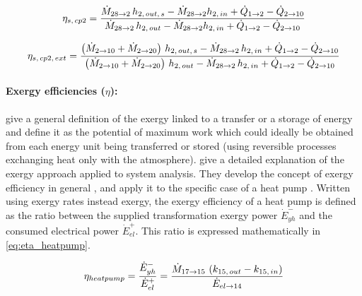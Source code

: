\begin{equation}
  \label{eq:eps_cp2_s}
  \eta_{s,\,cp2} = \dfrac{\dotM{28}{2} \, h_{2,\,out,\,s} - \dotM{28}{2}
    h_{2,\,in} + \dot{Q}_{1 \rightarrow 2} - \dot{Q}_{2 \rightarrow
      10}}{\dotM{28}{2} \, h_{2,\,out} - \dotM{28}{2} h_{2,\,in} +
    \dot{Q}_{1 \rightarrow 2} - \dot{Q}_{2 \rightarrow 10}}
  \tagaddtextone{$\left[-\right]$}
\end{equation}

\begin{equation}
  \label{eq:eps_cp2_s_ext}
  \eta_{s,\,cp2,\,ext} = \dfrac{\left( \dotM{2}{10} + \dotM{2}{20}
    \right) \, h_{2,\,out,\,s} - \dotM{28}{2} \, h_{2,\,in} +
    \dot{Q}_{1 \rightarrow 2} - \dot{Q}_{2 \rightarrow 10}}{\left(
      \dotM{2}{10} + \dotM{2}{20} \right) \, h_{2,\,out} -
    \dotM{28}{2} \, h_{2,\,in} + \dot{Q}_{1 \rightarrow 2} -
    \dot{Q}_{2 \rightarrow 10}}
  \tagaddtexttwo{$\left[-\right]$}
\end{equation}

\paragraph{Exergy efficiencies ($\eta$):}

\citet[based on def.~p.\,2]{Favrat-Epelly-2008a} give a general
definition of the exergy linked to a transfer or a storage of energy
and define it as the potential of maximum work which could ideally be
obtained from each energy unit being transferred or stored (using
reversible processes exchanging heat only with the
atmosphere). \citet[p.\,406--448]{Borel-Favrat-2010a} give a detailed
explanation of the exergy approach applied to system analysis. They
develop the concept of exergy efficiency in general
\citep[p.\,447--448]{Borel-Favrat-2010a}, and apply it to the specific
case of a heat pump \citep[p.\,642]{Borel-Favrat-2010a}. Written using
exergy rates instead exergy, the exergy efficiency of a heat pump is
defined as the ratio between the supplied transformation exergy power
$\dot{E}^-_{yh}$ and the consumed electrical power
$\dot{E}^+_{el}$. This ratio is expressed mathematically in
\cref{eq:eta_heatpump}.

\begin{equation}
  \label{eq:eta_heatpump}
  \eta_{heatpump} = \dfrac{\dot{E}^-_{yh}}{\dot{E}^+_{el}} =
  \dfrac{\dotM{17}{15} \, \left( k_{15,\,out} - k_{15,\,in} \right)}
  {\dotE{el}{14}}
  \tagaddtexttwo{$\left[-\right]$}
\end{equation}


